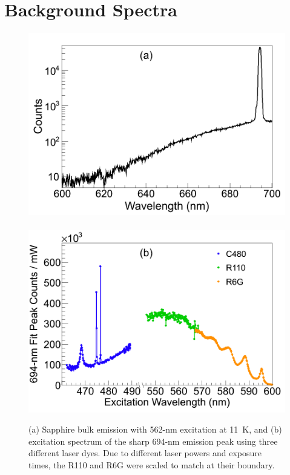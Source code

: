 



\section{Background Spectra}
\label{sec:bgs}

\begin{figure} %
        \centering
                \includegraphics[width=.5\textwidth]{figures/Cr_a.png}
                ~
                \includegraphics[width=.5\textwidth]{figures/Cr_b.png}
                \caption{(a) Sapphire bulk emission with 562-nm excitation at 11~K, and (b) excitation spectrum of the sharp 694-nm emission peak using three different laser dyes.  Due to different laser powers and exposure times, the R110 and R6G were scaled to match at their boundary.}
\label{fig:Cr}
\end{figure}

